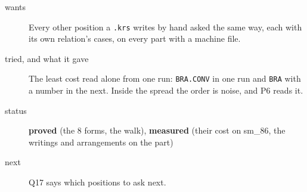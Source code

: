 \begin{description}
\item[{wants}] Every other position a \texttt{.\allowbreak{}krs} writes by hand asked the same way, each with its own relation's cases, on every part with a machine file.
\item[{tried, and what it gave}] The least cost read alone from one run: \texttt{BRA.\allowbreak{}CONV} in one run and \texttt{BRA} with a number in the next. Inside the spread the order is noise, and P6 reads it.
\item[{status}] \textbf{proved} (the 8 forms, the walk), \textbf{measured} (their cost on sm\_\allowbreak{}86, the writings and arrangements on the part)
\item[{next}] Q17 says which positions to ask next.
\end{description}

